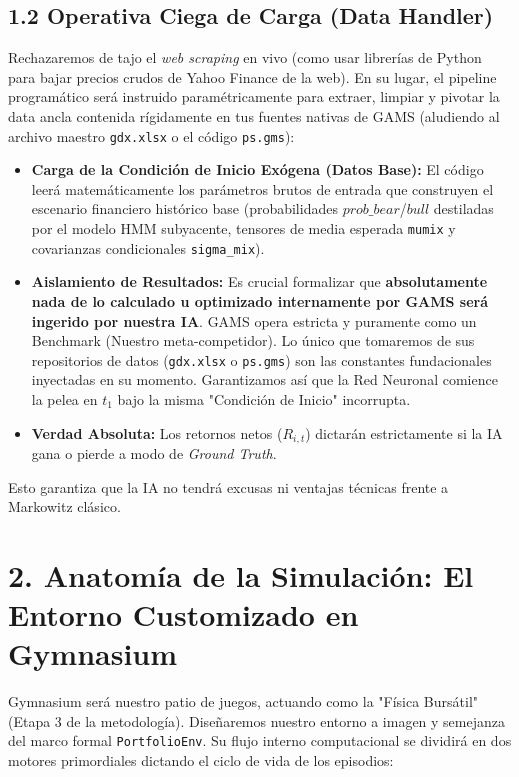 \documentclass[11pt,a4paper]{article}
\begin{document}
\subsection{1.2 Operativa Ciega de Carga (Data Handler)}
Rechazaremos de tajo el \textit{web scraping} en vivo (como usar librerías de Python para bajar precios crudos de Yahoo Finance de la web). En su lugar, el pipeline programático será instruido paramétricamente para extraer, limpiar y pivotar la data ancla contenida rígidamente en tus fuentes nativas de GAMS (aludiendo al archivo maestro \texttt{gdx.xlsx} o el código \texttt{ps.gms}):
\begin{itemize}
    \item \textbf{Carga de la Condición de Inicio Exógena (Datos Base):} El código leerá matemáticamente los parámetros brutos de entrada que construyen el escenario financiero histórico base (probabilidades $prob\_bear$/$bull$ destiladas por el modelo HMM subyacente, tensores de media esperada \texttt{mumix} y covarianzas condicionales \texttt{sigma\_mix}).
    \item \textbf{Aislamiento de Resultados:} Es crucial formalizar que \textbf{absolutamente nada de lo calculado u optimizado internamente por GAMS será ingerido por nuestra IA}. GAMS opera estricta y puramente como un Benchmark (Nuestro meta-competidor). Lo único que tomaremos de sus repositorios de datos (\texttt{gdx.xlsx} o \texttt{ps.gms}) son las constantes fundacionales inyectadas en su momento. Garantizamos así que la Red Neuronal comience la pelea en $t_1$ bajo la misma "Condición de Inicio" incorrupta.
    \item \textbf{Verdad Absoluta:} Los retornos netos ($R_{i,t}$) dictarán estrictamente si la IA gana o pierde a modo de \textit{Ground Truth}.\end{itemize}
Esto garantiza que la IA no tendrá excusas ni ventajas técnicas frente a Markowitz clásico. 

\section{2. Anatomía de la Simulación: El Entorno Customizado en Gymnasium}
Gymnasium será nuestro patio de juegos, actuando como la "Física Bursátil" (Etapa 3 de la metodología). Diseñaremos nuestro entorno a imagen y semejanza del marco formal \texttt{PortfolioEnv}. Su flujo interno computacional se dividirá en dos motores primordiales dictando el ciclo de vida de los episodios:
\end{document}
